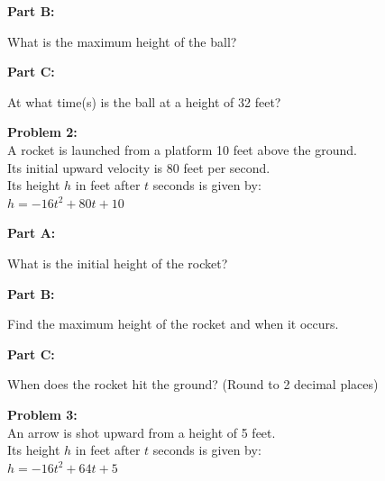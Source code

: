 \documentclass[12pt]{article}
\begin{document}
			\vspace{4cm}

			\textbf{Part B:}
            
            What is the maximum height of the ball?

			\vspace{4cm}

			\textbf{Part C:}
            
            At what time(s) is the ball at a height of 32 feet?

			\newpage

			\textbf{Problem 2:}\\

			A rocket is launched from a platform 10 feet above the ground.\\

			Its initial upward velocity is 80 feet per second.\\

			Its height $h$ in feet after $t$ seconds is given by:\\

			$h = -16t^2 + 80t + 10$

			\vspace{0.5cm}

			\textbf{Part A:}
            
            What is the initial height of the rocket?

			\vspace{2cm}

			\textbf{Part B:}
            
            Find the maximum height of the rocket and when it occurs.

			\vspace{5cm}

			\textbf{Part C:}
            
            When does the rocket hit the ground? (Round to 2 decimal places)

			\newpage

			\textbf{Problem 3:}\\

			An arrow is shot upward from a height of 5 feet.\\

			Its height $h$ in feet after $t$ seconds is given by:\\

			$h = -16t^2 + 64t + 5$

			\vspace{0.5cm}
\end{document}
